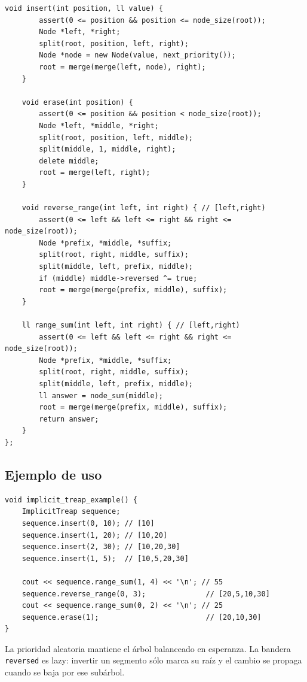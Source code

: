 \begin{lstlisting}[style=cpp]
    void insert(int position, ll value) {
        assert(0 <= position && position <= node_size(root));
        Node *left, *right;
        split(root, position, left, right);
        Node *node = new Node(value, next_priority());
        root = merge(merge(left, node), right);
    }

    void erase(int position) {
        assert(0 <= position && position < node_size(root));
        Node *left, *middle, *right;
        split(root, position, left, middle);
        split(middle, 1, middle, right);
        delete middle;
        root = merge(left, right);
    }

    void reverse_range(int left, int right) { // [left,right)
        assert(0 <= left && left <= right && right <= node_size(root));
        Node *prefix, *middle, *suffix;
        split(root, right, middle, suffix);
        split(middle, left, prefix, middle);
        if (middle) middle->reversed ^= true;
        root = merge(merge(prefix, middle), suffix);
    }

    ll range_sum(int left, int right) { // [left,right)
        assert(0 <= left && left <= right && right <= node_size(root));
        Node *prefix, *middle, *suffix;
        split(root, right, middle, suffix);
        split(middle, left, prefix, middle);
        ll answer = node_sum(middle);
        root = merge(merge(prefix, middle), suffix);
        return answer;
    }
};
\end{lstlisting}

\subsection{Ejemplo de uso}

\begin{lstlisting}[style=cpp]
void implicit_treap_example() {
    ImplicitTreap sequence;
    sequence.insert(0, 10); // [10]
    sequence.insert(1, 20); // [10,20]
    sequence.insert(2, 30); // [10,20,30]
    sequence.insert(1, 5);  // [10,5,20,30]

    cout << sequence.range_sum(1, 4) << '\n'; // 55
    sequence.reverse_range(0, 3);              // [20,5,10,30]
    cout << sequence.range_sum(0, 2) << '\n'; // 25
    sequence.erase(1);                         // [20,10,30]
}
\end{lstlisting}

La prioridad aleatoria mantiene el \'arbol balanceado en esperanza. La bandera
\texttt{reversed} es lazy: invertir un segmento s\'olo marca su ra\'iz y el
cambio se propaga cuando se baja por ese sub\'arbol.

